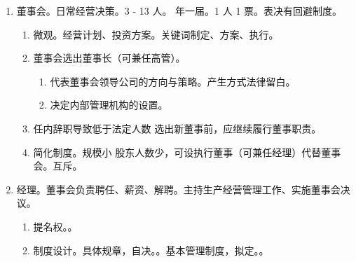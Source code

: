 \begin{enumerate}
\begin{enumerate}
\begin{enumerate}
\begin{enumerate}
                          \item {}。做题不要轻易选无效。
                          \item {}（召集、表决方式）  日向法院申请撤销。
                        \end{enumerate}
                  \item {}。内外有别。
                        \begin{enumerate}
                          \item {}。
                          \item {}。
                        \end{enumerate}
                \end{enumerate}
          \item 董事会。日常经营决策。3 - 13 人。 年一届。1 人 1 票。表决有回避制度。
                \begin{enumerate}
                  \item 微观。经营计划、投资方案。关键词制定、方案、执行。
                  \item 董事会选出董事长（可兼任高管）。
                        \begin{enumerate}
                          \item 代表董事会领导公司的方向与策略。产生方式法律留白。
                          \item 决定内部管理机构的设置。
                        \end{enumerate}
                  \item 任内辞职导致低于法定人数 \yjt 选出新董事前，应继续履行董事职责。
                  \item 简化制度。规模小 \hz 股东人数少，可设执行董事（可兼任经理）代替董事会。互斥。
                \end{enumerate}
          \item 经理。董事会负责聘任、薪资、解聘。主持生产经营管理工作、实施董事会决议。
                \begin{enumerate}
                  \item 提名权。。
                  \item 制度设计。\yi 具体规章，自决。。\er 基本管理制度，拟定。。

\end{enumerate}
\end{enumerate}
\end{enumerate}
